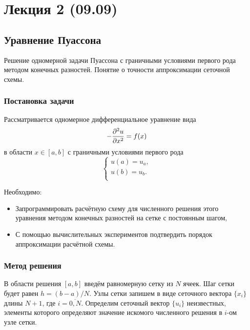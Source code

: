 \section{Лекция 2 (09.09)}
\subsection{Уравнение Пуассона}

Решение одномерной задачи Пуассона с граничными условиями первого рода методом конечных разностей.
Понятие о точности аппроксимации сеточной схемы.

\subsubsection{Постановка задачи}
Рассматривается одномерное дифференциальное уравнение вида
\begin{equation}
    \label{eq:poisson1d}
    -\dfrac{\partial^2 u}{\partial x^2} = f(x)
\end{equation}
в области $x\in[a,b]$ с граничными условиями первого рода
\begin{equation}
	\label{eq:poisson1d_bc}
	\begin{cases}
        u(a)=u_a,\\[5pt]
        u(b)=u_b.\\
	\end{cases}
\end{equation}

Необходимо:
\begin{itemize}
\item 
	Запрограммировать расчётную схему для численного решения этого уравнения методом конечных разностей
	на сетке с постоянным шагом,
\item
	С помощью вычислительных экспериментов подтвердить порядок аппроксимации расчётной схемы.
\end{itemize}

\subsubsection{Метод решения}


В области решения $[a,b]$ введём равномерную сетку из $N$ ячеек.
Шаг сетки будет равен $h=(b-a)/N$.
Узлы сетки запишем в виде сеточного вектора $\{x_i\}$ длины $N+1$, где $i=\overline{0,N}$.
Определим сеточный вектор $\{u_i\}$ неизвестных, элементы которого определяют значение искомого численного решения в $i$-ом узле сетки. 

